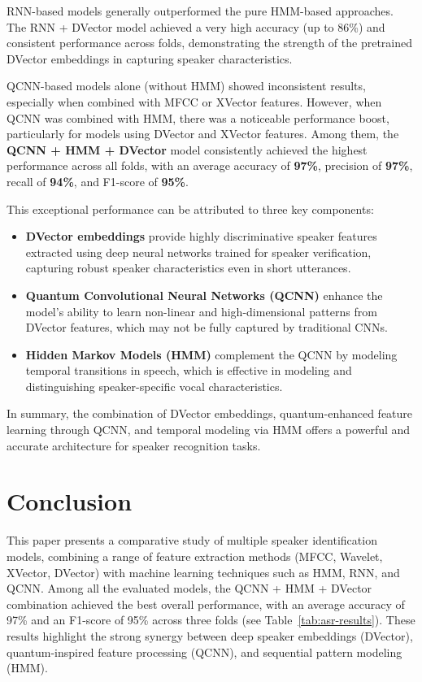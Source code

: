 \documentclass[conference]{IEEEtran}
\begin{document}
RNN-based models generally outperformed the pure HMM-based approaches. The RNN + DVector model achieved a very high accuracy (up to 86\%) and consistent performance across folds, demonstrating the strength of the pretrained DVector embeddings in capturing speaker characteristics.

QCNN-based models alone (without HMM) showed inconsistent results, especially when combined with MFCC or XVector features. However, when QCNN was combined with HMM, there was a noticeable performance boost, particularly for models using DVector and XVector features. Among them, the \textbf{QCNN + HMM + DVector} model consistently achieved the highest performance across all folds, with an average accuracy of \textbf{97\%}, precision of \textbf{97\%}, recall of \textbf{94\%}, and F1-score of \textbf{95\%}.

This exceptional performance can be attributed to three key components:
\begin{itemize}
    \item \textbf{DVector embeddings} provide highly discriminative speaker features extracted using deep neural networks trained for speaker verification, capturing robust speaker characteristics even in short utterances.
    \item \textbf{Quantum Convolutional Neural Networks (QCNN)} enhance the model’s ability to learn non-linear and high-dimensional patterns from DVector features, which may not be fully captured by traditional CNNs.
    \item \textbf{Hidden Markov Models (HMM)} complement the QCNN by modeling temporal transitions in speech, which is effective in modeling and distinguishing speaker-specific vocal characteristics.
\end{itemize}

In summary, the combination of DVector embeddings, quantum-enhanced feature learning through QCNN, and temporal modeling via HMM offers a powerful and accurate architecture for speaker recognition tasks.

\section{Conclusion}

This paper presents a comparative study of multiple speaker identification models, combining a range of feature extraction methods (MFCC, Wavelet, XVector, DVector) with machine learning techniques such as HMM, RNN, and QCNN. Among all the evaluated models, the QCNN + HMM + DVector combination achieved the best overall performance, with an average accuracy of 97\% and an F1-score of 95\% across three folds (see Table~\ref{tab:asr-results}). These results highlight the strong synergy between deep speaker embeddings (DVector), quantum-inspired feature processing (QCNN), and sequential pattern modeling (HMM).
\end{document}
